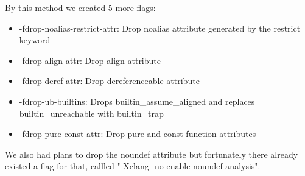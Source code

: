 By this method we created 5 more flags:
\begin{itemize}
  \item -fdrop-noalias-restrict-attr: Drop noalias attribute generated by the
restrict keyword
  \item -fdrop-align-attr: Drop align attribute
  \item -fdrop-deref-attr: Drop dereferenceable attribute
  \item -fdrop-ub-builtins: Drops builtin_assume_aligned and replaces builtin_unreachable with builtin_trap
  \item -fdrop-pure-const-attr: Drop pure and const function attributes
\end{itemize}

We also had plans to drop the noundef attribute but fortunately there already
existed a flag for that, callled "-Xclang -no-enable-noundef-analysis".
